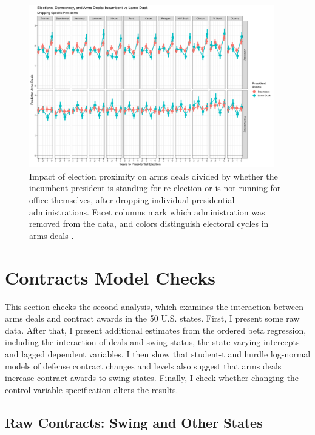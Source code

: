 \documentclass[12pt]{article}
\begin{document}
\begin{figure}[htpb]
	\centering
		\includegraphics[width=0.95\textwidth]{deals-pres-drop.png}
	\caption{Impact of election proximity on arms deals divided by whether the incumbent president is standing for re-election or is not running for office themselves, after dropping individual presidential administrations. Facet columns mark which administration was removed from the data, and colors distinguish electoral cycles in arms deals .}
	\label{fig:deals-pres-drop}
\end{figure}






\newpage



\section{Contracts Model Checks} 

This section checks the second analysis, which examines the interaction between arms deals and contract awards in the 50 U.S. states. 
First, I present some raw data. 
After that, I present additional estimates from the ordered beta regression, including the interaction of deals and swing status, the state varying intercepts and lagged dependent variables. 
I then show that student-t and hurdle log-normal models of defense contract changes and levels also suggest that arms deals increase contract awards to swing states. 
Finally, I check whether changing the control variable specification alters the results. 

\subsection{Raw Contracts: Swing and Other States}
\end{document}

